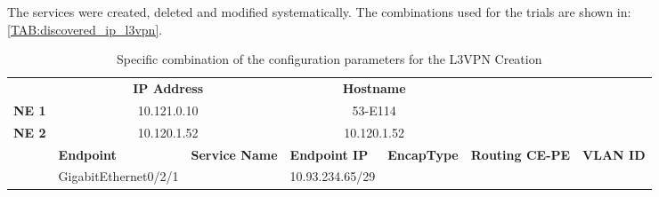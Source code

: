 \documentclass[a4paper,fleqn]{cas-dc}
\begin{document}
The services were created, deleted and modified systematically. The combinations used for the trials are shown in: \cref{TAB:discovered_ip_l3vpn}.

\begin{table}[]
\caption{Specific combination of the configuration parameters for the L3VPN Creation}
\begin{tabular}{c|c|c|l|c|cl}
\cline{2-5}
\multicolumn{1}{l|}{\cellcolor[HTML]{EFEFEF}}               & \multicolumn{2}{c|}{\cellcolor[HTML]{C0C0C0}\textbf{IP Address}}                                                                     & \multicolumn{2}{c|}{\cellcolor[HTML]{C0C0C0}\textbf{Hostname}}                          & \multicolumn{2}{l}{}                                                                                                                \\ \cline{1-5}
\multicolumn{1}{|l|}{\textbf{NE 1}}                         & \multicolumn{2}{c|}{10.121.0.10}                                                                                                     & \multicolumn{2}{c|}{53-E114}                                                            & \multicolumn{2}{l}{}                                                                                                                \\ \cline{1-5}
\multicolumn{1}{|l|}{\textbf{NE 2}}                         & \multicolumn{2}{c|}{10.120.1.52}                                                                                                     & \multicolumn{2}{c|}{10.120.1.52}                                                        & \multicolumn{2}{l}{\multirow{-3}{*}{}}                                                                                              \\ \hline
\rowcolor[HTML]{C0C0C0} 
\multicolumn{1}{|l|}{\cellcolor[HTML]{C0C0C0}\textbf{Test}} & \multicolumn{1}{l|}{\cellcolor[HTML]{C0C0C0}\textbf{Endpoint}} & \multicolumn{1}{l|}{\cellcolor[HTML]{C0C0C0}\textbf{Service Name}} & \textbf{Endpoint IP} & \multicolumn{1}{l|}{\cellcolor[HTML]{C0C0C0}\textbf{EncapType}} & \multicolumn{1}{l|}{\cellcolor[HTML]{C0C0C0}\textbf{Routing CE-PE}} & \multicolumn{1}{l|}{\cellcolor[HTML]{C0C0C0}\textbf{VLAN ID}} \\ \hline
\multicolumn{1}{|c|}{}                                      & GigabitEthernet0/2/1                                            &                                                                    & 10.93.234.65/29       &                                                                 & \multicolumn{1}{c|}{}                                               & \multicolumn{1}{l|}{}                                         \\ \cline{2-2} \cline{4-4}

\end{tabular}
\end{table}
\end{document}
